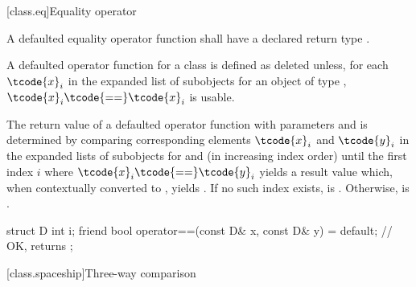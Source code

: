 [class.eq]{Equality operator}
%

\pnum
A defaulted equality operator function
shall have a declared return type .

\pnum
A defaulted \tcode{==} operator function for a class 
is defined as deleted
unless, for each $\tcode{x}_i$ in the expanded list of subobjects
for an object  of type ,
$\tcode{x}_i\tcode{ == }\tcode{x}_i$
is usable.

\pnum
The return value  of a defaulted \tcode{==} operator function
with parameters  and  is determined
by comparing corresponding elements $\tcode{x}_i$ and $\tcode{y}_i$
in the expanded lists of subobjects for  and 
(in increasing index order)
until the first index $i$
where $\tcode{x}_i\tcode{ == }\tcode{y}_i$ yields a result value which,
when contextually converted to , yields .
If no such index exists,  is .
Otherwise,  is .

\pnum
\begin{example}
\begin{codeblock}
struct D {
  int i;
  friend bool operator==(const D& x, const D& y) = default;
                                                // OK, returns 
};
\end{codeblock}
\end{example}

[class.spaceship]{Three-way comparison}
%

